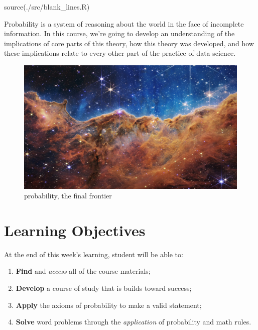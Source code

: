 \documentclass[
  letterpaper,
  DIV=11,
  numbers=noendperiod]{scrreprt}
\newenvironment{Shaded}{\begin{snugshade}}{\end{snugshade}}
\newcommand{\FunctionTok}[1]{\textcolor[rgb]{0.28,0.35,0.67}{#1}}
\newcommand{\NormalTok}[1]{\textcolor[rgb]{0.00,0.23,0.31}{#1}}
\newcommand{\StringTok}[1]{\textcolor[rgb]{0.13,0.47,0.30}{#1}}
\providecommand{\tightlist}{%
  \setlength{\itemsep}{0pt}\setlength{\parskip}{0pt}}\usepackage{longtable,booktabs,array}
\begin{document}
\begin{Shaded}
\begin{Highlighting}[]
\FunctionTok{source}\NormalTok{(}\StringTok{\textquotesingle{}./src/blank\_lines.R\textquotesingle{}}\NormalTok{)}
\end{Highlighting}
\end{Shaded}

Probability is a system of reasoning about the world in the face of
incomplete information. In this course, we're going to develop an
understanding of the implications of core parts of this theory, how this
theory was developed, and how these implications relate to every other
part of the practice of data science.

\begin{figure}[H]

{\centering \includegraphics{./images/webb.jpg}

}

\caption{probability, the final frontier}

\end{figure}%

\section{Learning Objectives}\label{learning-objectives}

At the end of this week's learning, student will be able to:

\begin{enumerate}
\def\labelenumi{\arabic{enumi}.}
\tightlist
\item
  \textbf{Find} and \emph{access} all of the course materials;
\item
  \textbf{Develop} a course of study that is builds toward success;
\item
  \textbf{Apply} the axioms of probability to make a valid statement;
\item
  \textbf{Solve} word problems through the \emph{application} of
  probability and math rules.
\end{enumerate}
\end{document}
